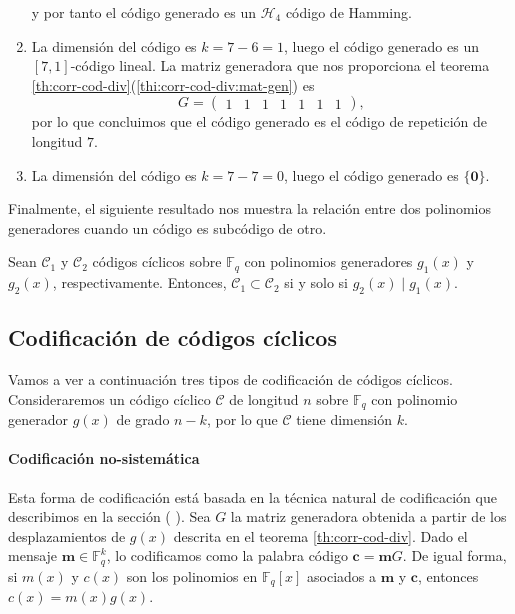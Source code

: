 \begin{example}
\begin{enumerate}
\[    \]
    y por tanto el código generado es un \(\mathcal H_4\) código de Hamming.
    \item La dimensión del código es \(k = 7 - 6 = 1\), luego el código generado es un \([7, 1]\)-código lineal.
    La matriz generadora que nos proporciona el teorema \ref{th:corr-cod-div}(\ref{thi:corr-cod-div:mat-gen}) es \[
      G = \left(\begin{array}{rrrrrrr}
        1 & 1 & 1 & 1 & 1 & 1 & 1
        \end{array}\right),
    \] por lo que concluimos que el código generado es el código de repetición de longitud \(7\).
    \item La dimensión del código es \(k = 7 - 7 = 0\), luego el código generado es \(\{\mathbf 0\}\).
  \end{enumerate}
\end{example}


Finalmente, el siguiente resultado nos muestra la relación entre dos polinomios generadores cuando un código es subcódigo de otro.

\begin{corollary}
  Sean \(\mathcal C_1\) y \(\mathcal C_2\) códigos cíclicos sobre \(\mathbb F_q\) con polinomios generadores \(g_1(x)\) y \(g_2(x)\), respectivamente.
  Entonces, \(\mathcal C_1 \subset \mathcal C_2 \) si y solo si \(g_2(x) \mid g_1(x)\).
\end{corollary}


\subsection{Codificación de códigos cíclicos}

Vamos a ver a continuación tres tipos de codificación de códigos cíclicos.
Consideraremos un código cíclico \(\mathcal C\) de longitud \(n\) sobre \(\mathbb F_q\) con polinomio generador \(g(x)\) de grado \(n - k\), por lo que \(\mathcal C\) tiene dimensión \(k\).

\paragraph{Codificación no-sistemática}

Esta forma de codificación está basada en la técnica natural de codificación que describimos en la sección (
).
Sea \(G\) la matriz generadora obtenida a partir de los desplazamientos de \(g(x)\) descrita en el teorema \ref{th:corr-cod-div}.
Dado el mensaje \(\mathbf m \in \mathbb F_q^k\), lo codificamos como la palabra código \(\mathbf c = \mathbf mG\).
De igual forma, si \(m(x)\) y \(c(x)\) son los polinomios en \(\mathbb F_q[x]\) asociados a \(\mathbf{m}\) y \(\mathbf c\), entonces \(c(x) = m(x)g(x)\).

